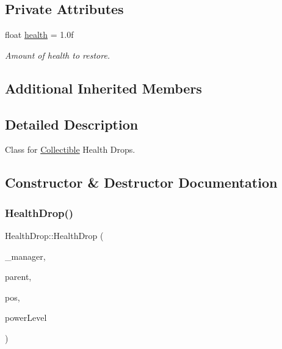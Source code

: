 \subsection*{Private Attributes}
\begin{DoxyCompactItemize}
\item 
\mbox{\label{class_health_drop_acf878935a984795ccb7ef9cd8414204c}} 
float \mbox{\hyperlink{class_health_drop_acf878935a984795ccb7ef9cd8414204c}{health}} = 1.\+0f
\begin{DoxyCompactList}\small\item\em Amount of health to restore. \end{DoxyCompactList}\end{DoxyCompactItemize}
\subsection*{Additional Inherited Members}


\subsection{Detailed Description}
Class for \mbox{\hyperlink{class_collectible}{Collectible}} Health Drops. 

\subsection{Constructor \& Destructor Documentation}
\mbox{\label{class_health_drop_a85bb6964b0457fe4277c3cae7d15a6cb}} 
\subsubsection{\texorpdfstring{HealthDrop()}{HealthDrop()}}
{\footnotesize\ttfamily Health\+Drop\+::\+Health\+Drop (\begin{DoxyParamCaption}\item[{\mbox{\hyperlink{class_game_manager}{Game\+Manager}} $\ast$}]{\+\_\+manager,  }\item[{\mbox{\hyperlink{class_game_entity}{Game\+Entity}} $\ast$}]{parent,  }\item[{\mbox{\hyperlink{classsf_1_1_vector2}{sf\+::\+Vector2f}}}]{pos,  }\item[{float}]{power\+Level }\end{DoxyParamCaption})}



